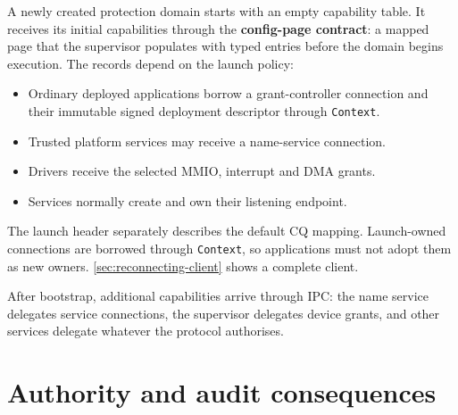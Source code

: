 A newly created protection domain starts with an empty capability table. It
receives its initial capabilities through the \textbf{config-page contract}: a
mapped page that the supervisor populates with typed entries before the domain
begins execution. The records depend on the launch policy:

\begin{itemize}
    \item Ordinary deployed applications borrow a grant-controller connection
        and their immutable signed deployment descriptor through \texttt{Context}.
    \item Trusted platform services may receive a name-service connection.
    \item Drivers receive the selected MMIO, interrupt and DMA grants.
    \item Services normally create and own their listening endpoint.
\end{itemize}

The launch header separately describes the default CQ mapping. Launch-owned
connections are borrowed through \texttt{Context}, so applications must not adopt
them as new owners. \autoref{sec:reconnecting-client} shows a complete client.

After bootstrap, additional capabilities arrive through IPC: the name service
delegates service connections, the supervisor delegates device grants, and other
services delegate whatever the protocol authorises.

\section{Authority and audit consequences}

